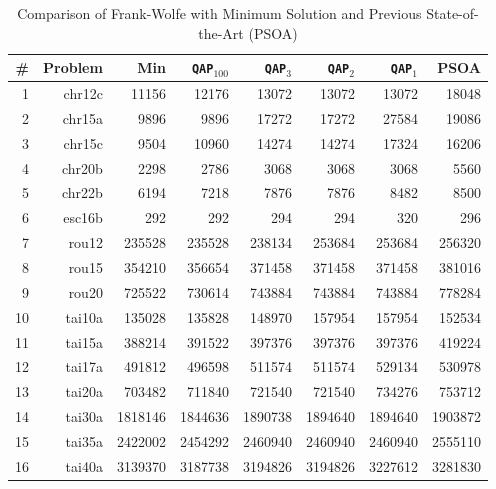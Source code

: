 \documentclass{article} %
\newcommand{\qapa}{\texttt{QAP$_1$} }
\newcommand{\qapb}{\texttt{QAP$_{100}$} }
\begin{document}
\begin{table}[h!]
\caption{Comparison of Frank-Wolfe with Minimum Solution and Previous State-of-the-Art (PSOA)}
\begin{center}
\begin{tabular}{|r|r|r||r|r|r|r|r|}
\hline
\# & Problem  &   Min    & \qapb & \texttt{QAP}$_{3}$ & \texttt{QAP}$_{2}$ & \qapa & PSOA\\
\hline
1&    chr12c &   11156 &   12176 &   13072 &   13072 &   13072 &   18048\\
2&    chr15a &    9896 &    9896 &   17272 &   17272 &   27584 &   19086\\
3&    chr15c &    9504 &   10960 &   14274 &   14274 &   17324 &   16206\\
4&   chr20b &    2298 &    2786 &    3068 &    3068 &    3068 &    5560\\
5&    chr22b &    6194 &    7218 &    7876 &    7876 &    8482 &    8500\\
6&    esc16b &     292 &     292 &     294 &     294 &     320 &     296\\
7&     rou12 &  235528 &  235528 &  238134 &  253684 &  253684 &  256320\\
8&     rou15 &  354210 &  356654 &  371458 &  371458 &  371458 &  381016\\
9&     rou20 &  725522 &  730614 &  743884 &  743884 &  743884 &  778284\\
10&    tai10a &  135028 &  135828 &  148970 &  157954 &  157954 &  152534\\
11&    tai15a &  388214 &  391522 &  397376 &  397376 &  397376 &  419224\\
12&    tai17a &  491812 &  496598 &  511574 &  511574 &  529134 &  530978\\
13&    tai20a &  703482 &  711840 &  721540 &  721540 &  734276 &  753712\\
14&    tai30a & 1818146 & 1844636 & 1890738 & 1894640 & 1894640 & 1903872\\
15&    tai35a & 2422002 & 2454292 & 2460940 & 2460940 & 2460940 & 2555110\\
16&    tai40a & 3139370 & 3187738 & 3194826 & 3194826 & 3227612 & 3281830\\
    \hline
\end{tabular}
\end{center}
\label{tab:fwpath}
\end{table}%
\end{document}
